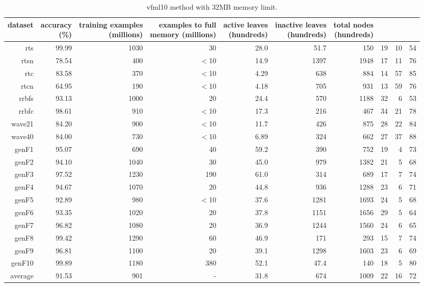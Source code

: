 \clearpage
\begin{table}
\caption{{\sc vfml10} method with 32MB memory limit.}
\label{tab:vfml10-32MB}
\centering
\begin{tabular}{|r|r|r|r|r|r|r|r|r|r|}
\hline
dataset	&
\rotatebox{90}{\parbox{9em}{accuracy\\(\%)}} &
\rotatebox{90}{\parbox{9em}{training examples\\(millions)}} &
\rotatebox{90}{\parbox{9em}{examples to full\\memory (millions)}} &
\rotatebox{90}{\parbox{9em}{active leaves\\(hundreds)}} &
\rotatebox{90}{\parbox{9em}{inactive leaves\\(hundreds)}} &
\rotatebox{90}{\parbox{9em}{total nodes\\(hundreds)}} &
\rotatebox{90}{\parbox{9em}{tree depth}}	&
\rotatebox{90}{\parbox{9em}{training speed (\%)}} &
\rotatebox{90}{\parbox{9em}{prediction speed (\%)}} \\
\hline
{\sc rts} & 99.99 & 1030 & 30 & 28.0 & 51.7 & 150 & 19 & 10 & 54 \\
{\sc rtsn} & 78.54 & 400 & $<$10 & 14.9 & 1397 & 1948 & 17 & 11 & 76 \\
{\sc rtc} & 83.58 & 370 & $<$10 & 4.29 & 638 & 884 & 14 & 57 & 85 \\
{\sc rtcn} & 64.95 & 190 & $<$10 & 4.18 & 705 & 931 & 13 & 59 & 76 \\
{\sc rrbfs} & 93.13 & 1000 & 20 & 24.4 & 570 & 1188 & 32 & 6 & 53 \\
{\sc rrbfc} & 98.61 & 910 & $<$10 & 17.3 & 216 & 467 & 34 & 21 & 78 \\
{\sc wave21} & 84.20 & 900 & $<$10 & 11.7 & 426 & 875 & 28 & 22 & 84 \\
{\sc wave40} & 84.00 & 730 & $<$10 & 6.89 & 324 & 662 & 27 & 37 & 88 \\
{\sc genF1} & 95.07 & 690 & 40 & 59.2 & 390 & 752 & 19 & 4 & 73 \\
{\sc genF2} & 94.10 & 1040 & 30 & 45.0 & 979 & 1382 & 21 & 5 & 68 \\
{\sc genF3} & 97.52 & 1230 & 190 & 61.0 & 314 & 689 & 17 & 7 & 74 \\
{\sc genF4} & 94.67 & 1070 & 20 & 44.8 & 936 & 1288 & 23 & 6 & 71 \\
{\sc genF5} & 92.89 & 980 & $<$10 & 37.6 & 1281 & 1693 & 24 & 5 & 68 \\
{\sc genF6} & 93.35 & 1020 & 20 & 37.8 & 1151 & 1656 & 29 & 5 & 64 \\
{\sc genF7} & 96.82 & 1080 & 20 & 36.9 & 1244 & 1560 & 24 & 6 & 65 \\
{\sc genF8} & 99.42 & 1290 & 60 & 46.9 & 171 & 293 & 15 & 7 & 74 \\
{\sc genF9} & 96.81 & 1100 & 20 & 39.1 & 1298 & 1603 & 23 & 6 & 69 \\
{\sc genF10} & 99.89 & 1180 & 380 & 52.1 & 47.4 & 140 & 18 & 5 & 80 \\
\hline
average & 91.53 & 901 &  -  & 31.8 & 674 & 1009 & 22 & 16 & 72 \\
\hline
\end{tabular}
\end{table}
